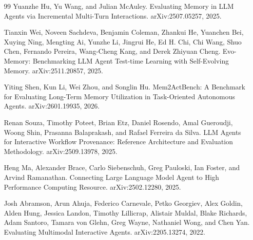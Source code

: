 \documentclass{article}
\begin{document}
\begin{thebibliography}{99}
Yuanzhe Hu, Yu Wang, and Julian McAuley.
\newblock Evaluating Memory in LLM Agents via Incremental Multi-Turn Interactions.
\newblock arXiv:2507.05257, 2025.

Tianxin Wei, Noveen Sachdeva, Benjamin Coleman, Zhankui He, Yuanchen Bei, Xuying Ning, Mengting Ai, Yunzhe Li, Jingrui He, Ed H. Chi, Chi Wang, Shuo Chen, Fernando Pereira, Wang-Cheng Kang, and Derek Zhiyuan Cheng.
\newblock Evo-Memory: Benchmarking LLM Agent Test-time Learning with Self-Evolving Memory.
\newblock arXiv:2511.20857, 2025.

Yiting Shen, Kun Li, Wei Zhou, and Songlin Hu.
\newblock Mem2ActBench: A Benchmark for Evaluating Long-Term Memory Utilization in Task-Oriented Autonomous Agents.
\newblock arXiv:2601.19935, 2026.

Renan Souza, Timothy Poteet, Brian Etz, Daniel Rosendo, Amal Gueroudji, Woong Shin, Prasanna Balaprakash, and Rafael Ferreira da Silva.
\newblock LLM Agents for Interactive Workflow Provenance: Reference Architecture and Evaluation Methodology.
\newblock arXiv:2509.13978, 2025.

Heng Ma, Alexander Brace, Carlo Siebenschuh, Greg Pauloski, Ian Foster, and Arvind Ramanathan.
\newblock Connecting Large Language Model Agent to High Performance Computing Resource.
\newblock arXiv:2502.12280, 2025.

Josh Abramson, Arun Ahuja, Federico Carnevale, Petko Georgiev, Alex Goldin, Alden Hung, Jessica Landon, Timothy Lillicrap, Alistair Muldal, Blake Richards, Adam Santoro, Tamara von Glehn, Greg Wayne, Nathaniel Wong, and Chen Yan.
\newblock Evaluating Multimodal Interactive Agents.
\newblock arXiv:2205.13274, 2022.

\end{thebibliography}
\end{document}
